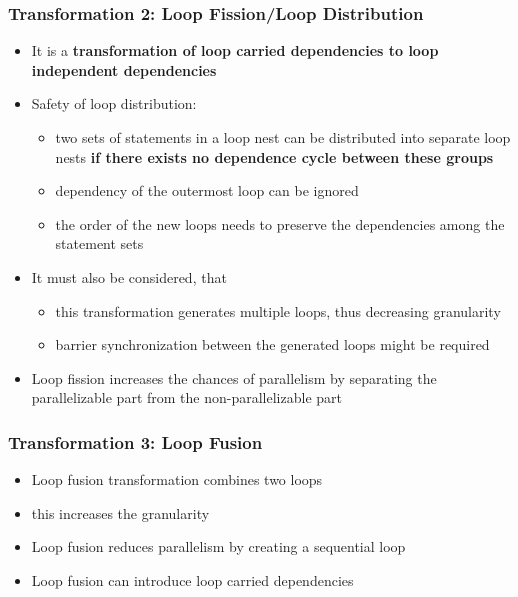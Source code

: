 \documentclass[12pt, a4paper]{report}
\begin{document}
\subsubsection{Transformation 2: Loop Fission/Loop Distribution}
\begin{itemize}
    \item It is a {\bfseries{transformation of loop carried dependencies to loop independent dependencies}}
    \item Safety of loop distribution:
    \begin{itemize}
        \item two sets of statements in a loop nest can be distributed into separate loop nests {\bfseries{if there exists no dependence cycle between these
              groups}}
        \item dependency of the outermost loop can be ignored
        \item the order of the new loops needs to preserve the dependencies among the statement sets
    \end{itemize}
    \item It must also be considered, that
    \begin{itemize}
        \item this transformation generates multiple loops, thus decreasing granularity
        \item barrier synchronization between the generated loops might be required
    \end{itemize}
    \item Loop fission increases the chances of parallelism by separating the parallelizable part from the non-parallelizable part
\end{itemize}

\subsubsection{Transformation 3: Loop Fusion}
\begin{itemize}
    \item Loop fusion transformation combines two loops
    \item this increases the granularity
    \item Loop fusion reduces parallelism by creating a sequential loop
    \item Loop fusion can introduce loop carried dependencies
\end{itemize}
\end{document}
